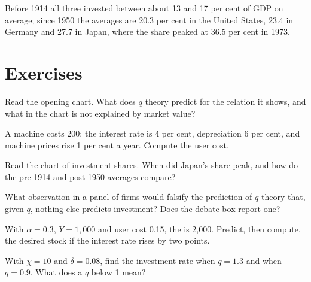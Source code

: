 Before 1914 all three invested between about 13 and 17 per cent of GDP on average; since 1950 the averages are 20.3 per cent in the
United States, 23.4 in Germany and 27.7 in Japan, where the share peaked at 36.5 per cent in 1973.

\section{Exercises}\label{sec:b2:investment:exercises}

\begin{exercise}[$\star$]\label{exo:b2:investment:1}
Read the opening chart. What does $q$ theory predict for the relation it shows, and what in the chart is not explained by
market value?
\end{exercise}

\begin{exercise}[$\star$]\label{exo:b2:investment:2}
A machine costs 200; the interest rate is 4 per cent, depreciation 6 per cent, and machine prices rise 1 per cent a year.
Compute the user cost.
\end{exercise}

\begin{exercise}[$\star$]\label{exo:b2:investment:3}
Read the chart of investment shares. When did Japan's share peak, and how do the pre-1914 and post-1950 averages compare?
\end{exercise}

\begin{exercise}[$\star$]\label{exo:b2:investment:4}
What observation in a panel of firms would falsify the prediction of $q$ theory that, given $q$, nothing else predicts
investment? Does the debate box report one?
\end{exercise}

\begin{exercise}[$\star\star$]\label{exo:b2:investment:5}
With $\alpha = 0.3$, $Y = 1{,}000$ and user cost 0.15, the  is 2,000. Predict, then compute, the desired stock if the interest
rate rises by two points.
\end{exercise}

\begin{exercise}[$\star\star$]\label{exo:b2:investment:6}
With $\chi = 10$ and $\delta = 0.08$, find the investment rate when $q = 1.3$ and when $q = 0.9$. What does a $q$ below 1 mean?
\end{exercise}

